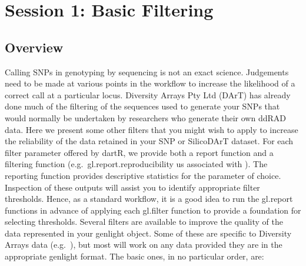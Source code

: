 \documentclass[
  letterpaper,
  DIV=11,
  numbers=noendperiod]{scrreprt}
\let\textttOrig\texttt
\renewcommand{\texttt}[1]{\textttOrig{\color{blue}{#1}}}
\begin{document}
\hypertarget{session-1-basic-filtering}{%
\section{Session 1: Basic Filtering}\label{session-1-basic-filtering}}

\hypertarget{overview}{%
\subsection{Overview}\label{overview}}

Calling SNPs in genotyping by sequencing is not an exact science.
Judgements need to be made at various points in the workflow to increase
the likelihood of a correct call at a particular locus. Diversity Arrays
Pty Ltd (DArT) has already done much of the filtering of the sequences
used to generate your SNPs that would normally be undertaken by
researchers who generate their own ddRAD data. Here we present some
other filters that you might wish to apply to increase the reliability
of the data retained in your SNP or SilicoDArT dataset. For each filter
parameter offered by dartR, we provide both a report function and a
filtering function (e.g.~gl.report.reproducibility us associated with
\texttt{gl.filter.reproducability}). The reporting function provides
descriptive statistics for the parameter of choice. Inspection of these
outputs will assist you to identify appropriate filter thresholds.
Hence, as a standard workflow, it is a good idea to run the gl.report
functions in advance of applying each gl.filter function to provide a
foundation for selecting thresholds. Several filters are available to
improve the quality of the data represented in your genlight object.
Some of these are specific to Diversity Arrays data
(e.g.~\texttt{gl.filter.reproducibility}), but most will work on any
data provided they are in the appropriate genlight format. The basic
ones, in no particular order, are:
\end{document}
